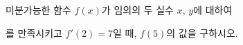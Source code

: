 미분가능한 함수 $f(x)$가 임의의 두 실수 $x$, $y$에 대하여\par\smallskip{}\par\smallskip\noindent 를 만족시키고 $f'(2)=7$일 때, $f(5)$의 값을 구하시오.
